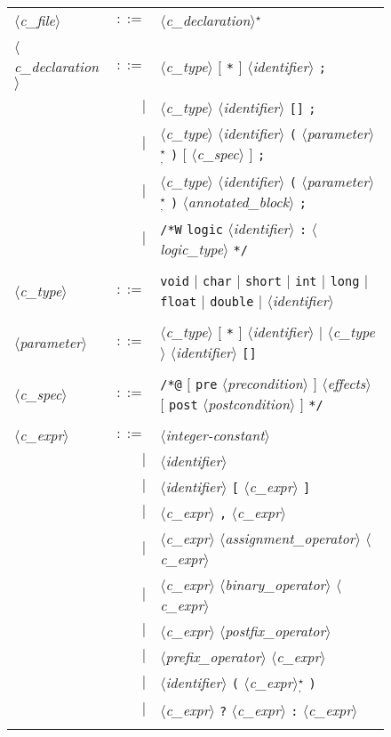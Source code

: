 \documentclass[a4paper,12pt]{report}
\newcommand{\te}[1]{\texttt{#1}}
\newcommand{\nt}[1]{$\langle$\textsl{#1}$\rangle$}
\newcommand{\etoile}{$^{\star}$}
\newcommand{\etoilesep}[1]{$^{\star}_#1$}
\begin{document}
\begin{figure}[htbp]
\begin{center}
\hrulefill\\
\begin{tabular}{lrl}
  \nt{c\_file}
    & $::=$ & \nt{c\_declaration}\etoile\ \\
  \\[0.1em]

  \nt{c\_declaration}
    & $::=$ & \nt{c\_type} $[$ \te{*} $]$ \nt{identifier} \te{;} \\
      & $|$ & \nt{c\_type} \nt{identifier} \te{[]} \te{;} \\
      & $|$ & \nt{c\_type} \nt{identifier} \te{(} 
              \nt{parameter}\etoilesep{\te{,}} \te{)} 
              $[$ \nt{c\_spec} $]$ \te{;} \\
      & $|$ & \nt{c\_type} \nt{identifier} \te{(} 
              \nt{parameter}\etoilesep{\te{,}} \te{)} 
              \nt{annotated\_block} \te{;} \\
      & $|$ & \te{/*W} \te{logic} \nt{identifier} \te{:} 
              \nt{logic\_type} \te{*/} \\
  \\[0.1em]

  \nt{c\_type}
    & $::=$ & \te{void} $|$ \te{char} $|$ \te{short} $|$ \te{int} 
              $|$ \te{long} $|$ \te{float} $|$ \te{double} 
              $|$ \nt{identifier} \\
  \\[0.1em]

  \nt{parameter}
    & $::=$ & \nt{c\_type} $[$ \te{*} $]$ \nt{identifier} 
          $|$ \nt{c\_type} \nt{identifier} \te{[]} \\
  \\[0.1em]

  \nt{c\_spec}
    & $::=$ & \te{/*@} $[$ \te{pre} \nt{precondition} $]$ \nt{effects}
              $[$ \te{post} \nt{postcondition} $]$ \te{*/}  \\
  \\[0.1em]

  \nt{c\_expr}
    & $::=$ & \nt{integer-constant} \\
    &   $|$ & \nt{identifier} \\
    &   $|$ & \nt{identifier} \te{[} \nt{c\_expr} \te{]} \\
    &   $|$ & \nt{c\_expr} \te{,} \nt{c\_expr} \\
    &   $|$ & \nt{c\_expr} \nt{assignment\_operator} \nt{c\_expr} \\
    &   $|$ & \nt{c\_expr} \nt{binary\_operator} \nt{c\_expr} \\
    &   $|$ & \nt{c\_expr} \nt{postfix\_operator} \\
    &   $|$ & \nt{prefix\_operator} \nt{c\_expr} \\
    &   $|$ & \nt{identifier} \te{(} \nt{c\_expr}\etoilesep{\te{,}} \te{)} \\
    &   $|$ & \nt{c\_expr} \te{?} \nt{c\_expr} \te{:} \nt{c\_expr} \\
  \\[0.1em]


\end{tabular}
\end{center}
\end{figure}
\end{document}
